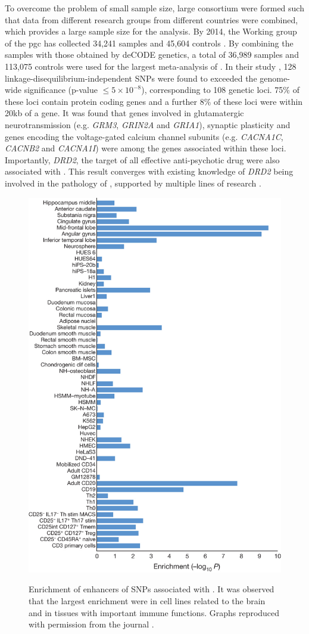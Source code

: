 	To overcome the problem of small sample size, large consortium were formed such that data from different research groups from different countries were combined, which provides a large sample size for the analysis.
	By 2014, the  Working group of the \gls{pgc} has collected 34,241  samples and 45,604 controls \citep{Ripke2014}.
	By combining the samples with those obtained by deCODE genetics, a total of 36,989  samples and 113,075 controls were used for the largest meta-analysis of .
	In their study \citep{Ripke2014}, 128 linkage-disequilibrium-independent \glspl{SNP} were found to  exceeded the genome-wide significance (p-value $\le 5\times10^{-8}$), corresponding to 108 genetic loci.
	75\% of these loci contain protein coding genes and a further 8\% of these loci were within 20kb of a gene. 
	It was found that genes involved in glutamatergic neurotransmission (e.g. \textit{GRM3}, \textit{GRIN2A} and \textit{GRIA1}), synaptic plasticity and genes encoding the voltage-gated calcium channel subunits (e.g. \textit{CACNA1C}, \textit{CACNB2} and \textit{CACNA1I}) were among the genes associated within these loci.
	Importantly, \textit{DRD2}, the target of all effective anti-psychotic drug were also associated with .
	This result converges with existing knowledge of \textit{DRD2} being involved in the pathology of , supported by multiple lines of research \citep{Talkowski2007}.
	\begin{figure}
		\centering
		\caption[Enrichment of enhancers of SNPs associated with Schizophrenia]{Enrichment of enhancers of SNPs associated with . 
			It was observed that the largest enrichment were in cell lines related to the brain and in tissues with important immune functions. 
			Graphs reproduced with permission from the journal \citep{Ripke2014}.}
		\includegraphics[height=\textwidth]{figure/pgc_enrichment_tissue.jpg}
		\label{fig:pgcEnrich}
	\end{figure}
